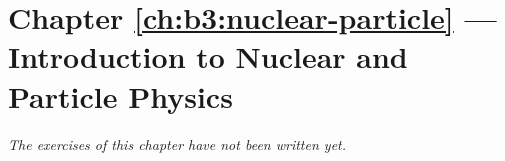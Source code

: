 \section*{Chapter \ref{ch:b3:nuclear-particle} --- Introduction to Nuclear and Particle Physics}


\emph{The exercises of this chapter have not been written yet.}
